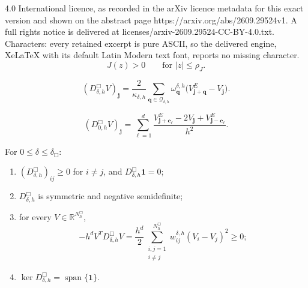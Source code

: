 \documentclass[10pt,a4paper]{amsart}
\newcommand{\R}{\mathbb{R}}
\newcommand{\ee}{\bm e}
\newcommand{\jj}{\bm j}
\newcommand{\one}{\mathbf{1}}
\newcommand{\qq}{\bm q}
\begin{document}
4.0 International licence, as recorded in the arXiv licence metadata for this exact version and shown on the abstract page https://arxiv.org/abs/2609.29524v1. A full rights notice is delivered at licenses/arxiv-2609.29524-CC-BY-4.0.txt. Characters: every retained excerpt is pure ASCII, so the delivered engine, XeLaTeX with its default Latin Modern text font, reports no missing character.
\begin{equation}
\label{eq:J-positive-ball}
 J(z)>0
 \qquad\text{for }|z|\le\rho_J.
\end{equation}

\begin{equation}
\label{eq:Dh}
 (D_{\delta,h}^{\Box}V)_{\jj}
 =
 \frac{2}{\kappa_{\delta,h}}
 \sum_{\qq\in\mathcal Q_{\delta,h}}
 \omega_{\qq}^{\delta,h}
 \big(V^E_{\jj+\qq}-V_{\jj}\big).
\end{equation}

\begin{equation}
\label{eq:local-Dh}
 (D_{0,h}^{\Box}V)_{\jj}
 =
 \sum_{\ell=1}^{d}
 \frac{V^E_{\jj+\ee_{\ell}}-2V_{\jj}
       +V^E_{\jj-\ee_{\ell}}}{h^2}.
\end{equation}

\begin{proposition}
\label{prop:matrix-structure}
For $0\le\delta\le\delta_{\Box}$:
\begin{enumerate}[label=(\roman*)]
\item $(D_{\delta,h}^{\Box})_{ij}\ge0$ for $i\ne j$, and $D_{\delta,h}^{\Box}\one=0$;
\item $D_{\delta,h}^{\Box}$ is symmetric and negative semidefinite;
\item for every $V\in\R^{N_h^{\Box}}$,
\begin{equation}
\label{eq:energy}
 -h^dV^TD_{\delta,h}^{\Box}V
 =
 \frac{h^d}{2}
 \sum_{\substack{i,j=1\\ i\ne j}}^{N_h^{\Box}}
 w_{ij}^{\delta,h}(V_i-V_j)^2
 \ge0;
\end{equation}
\item $\ker D_{\delta,h}^{\Box}=\operatorname{span}\{\one\}$.
\end{enumerate}
\end{proposition}
\end{document}
